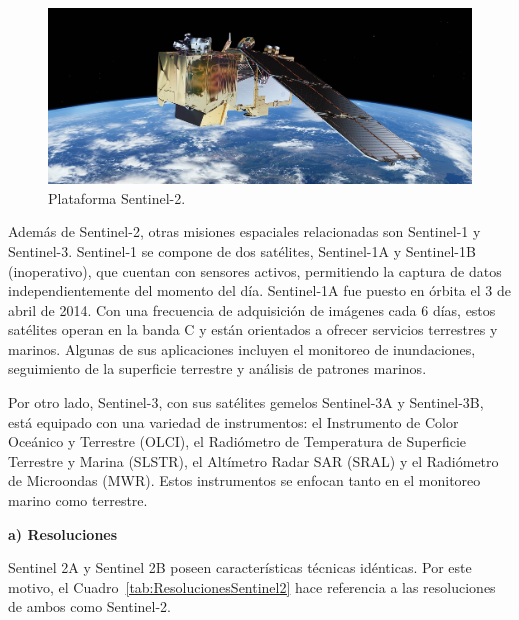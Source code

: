 \begin{figure}[H]
    \begin{center}
        \includegraphics[width=1\textwidth]{Images/Sentinel2.jpg}
    \end{center}
    \caption{Plataforma Sentinel-2.}
    \label{fig:Sentinel2}
\end{figure}

Además de Sentinel-2, otras misiones espaciales relacionadas son Sentinel-1 y Sentinel-3. Sentinel-1 se compone de dos satélites, Sentinel-1A y Sentinel-1B (inoperativo), que cuentan con sensores activos, permitiendo la captura de datos independientemente del momento del día. Sentinel-1A fue puesto en órbita el 3 de abril de 2014. Con una frecuencia de adquisición de imágenes cada 6 días, estos satélites operan en la banda C y están orientados a ofrecer servicios terrestres y marinos. Algunas de sus aplicaciones incluyen el monitoreo de inundaciones, seguimiento de la superficie terrestre y análisis de patrones marinos.

Por otro lado, Sentinel-3, con sus satélites gemelos Sentinel-3A y Sentinel-3B, está equipado con una variedad de instrumentos: el Instrumento de Color Oceánico y Terrestre (OLCI), el Radiómetro de Temperatura de Superficie Terrestre y Marina (SLSTR), el Altímetro Radar SAR (SRAL) y el Radiómetro de Microondas (MWR). Estos instrumentos se enfocan tanto en el monitoreo marino como terrestre.

\textbf{a) Resoluciones}

Sentinel 2A y Sentinel 2B poseen características técnicas idénticas. Por este motivo, el Cuadro~\ref{tab:ResolucionesSentinel2} hace referencia a las resoluciones de ambos como Sentinel-2.

